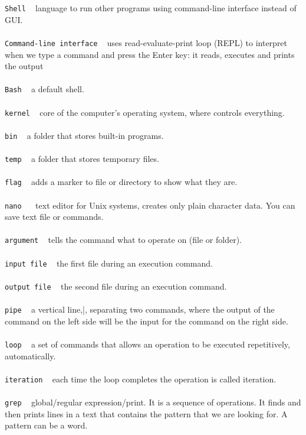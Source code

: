\documentclass{article}
\begin{document}
\texttt{Shell} ~ language to run other programs using command-line interface instead of GUI.\\
\\
\texttt{Command-line interface} ~ uses read-evaluate-print loop (REPL) to interpret when we type a command and press the Enter key: it reads, executes and prints the output\\
\\
\texttt{Bash} ~	a default shell.\\
\\
\texttt{kernel} ~ core of the computer's operating system, where controls everything. \\
\\
\texttt{bin} ~ a folder that stores built-in programs.\\
\\
\texttt{temp} ~ a folder that stores temporary files.\\
\\
\texttt{flag} ~ adds a marker to file or directory to show what they are.\\
\\
\texttt{nano	} ~	text editor for Unix systems, creates only plain character data. You can save text file or commands. \\
\\
\texttt{argument} ~	tells the command what to operate on (file or folder).\\
\\
\texttt{input file} ~ the first file during an execution command. \\
\\
\texttt{output file} ~ the second file during an execution command.\\
\\
\texttt{pipe} ~ a vertical line,|, separating two commands, where the output of the command on the left side will be the input for the command on the right side.\\
\\
\texttt{loop} ~ a set of commands that allows an operation to be executed repetitively, automatically.\\
\\
\texttt{iteration} ~ each time the loop completes the operation is called iteration.\\  
\\
\texttt{grep} ~ global/regular expression/print. It is a sequence of operations. It finds and then prints lines in a text that contains the pattern that we are looking for. A pattern can be a word.\\
\\
\end{document}
